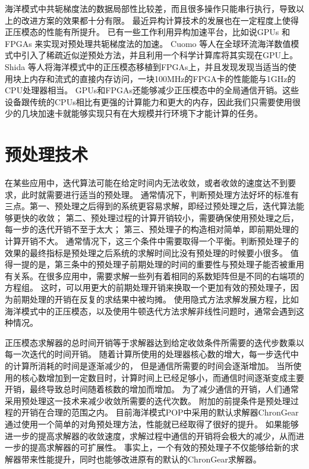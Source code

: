  

海洋模式中共轭梯度法的数据局部性比较差，而且很多操作只能串行执行，导致以上的改进方案的效果都十分有限。
最近异构计算技术的发展也在一定程度上使得正压模态的性能有所提升。 
已有一些工作利用异构加速平台，比如说GPUs \cite{cuomo2012pcg} 和FPGAs \cite{Shida2007}来实现对预处理共轭梯度法的加速。 
Cuomo 等人\cite{cuomo2012pcg}在全球环流海洋数值模式中引入了稀疏近似逆预处方法，并且利用一个科学计算库将其实现在GPU上。 
Shida 等人\cite{Shida2007}将海洋模式中的正压模态移植到FPGAs上，并且发现发现当适当的使用块上内存和流式的直接内存访问，一块100MHz的FPGA卡的性能能与1GHz的CPU处理器相当。 
GPUs和FPGAs还能够减少正压模态中的全局通信开销。这些设备跟传统的CPUs相比有更强的计算能力和更大的内存，因此我们只需要使用很少的几块加速卡就能够实现只有在大规模并行环境下才能计算的任务。 


\section{预处理技术}
\label{related:precond}
在某些应用中，迭代算法可能在给定时间内无法收敛，或者收敛的速度达不到要求，此时就需要进行适当的预处理。
通常情况下，判断预处理方法好坏的标准有三点。第一、预处理之后得到的系统更容易求解，即经过预处理之后，迭代算法能够更快的收敛； 第二、预处理过程的计算开销较小，需要确保使用预处理之后，每一步的迭代开销不至于太大； 第三、预处理子的构造相对简单，即前期处理的计算开销不大。 
通常情况下，这三个条件中需要取得一个平衡。判断预处理子的效果的最终指标是预处理之后系统的求解时间比没有预处理的时候要小很多。 
值得一提的是，第三条中的预处理子前期处理的时间的重要性与预处理子能否被重用有关系。在很多应用中，需要求解一些列有着相同的系数矩阵但是不同的右端项的方程组。
这时，可以用更大的前期处理开销来换取一个更加有效的预处理子，因为前期处理的开销在反复的求结果中被均摊。 
使用隐式方法求解发展方程，比如海洋模式中的正压模态，以及使用牛顿迭代方法求解非线性问题时，通常会遇到这种情况\cite{benzi2002preconditioning}。

正压模态求解器的总时间开销等于求解器达到给定收敛条件所需要的迭代步数乘以每一次迭代的时间开销。
随着计算所使用的处理器核心数的增大，每一步迭代中的计算所消耗的时间是逐渐减少的，
但是通信所需要的时间会逐渐增加。 
当所使用的核心数增加到一定数目时，计算时间上已经足够小，而通信时间逐渐变成主要开销，最终导致总时间随着核数的增加而增加。 
为了减少通信的开销，人们通常采用预处理这一技术来减少收敛所需要的迭代次数。
附加的前提条件是预处理过程的开销在合理的范围之内。 
目前海洋模式POP中采用的默认求解器ChronGear通过使用一个简单的对角预处理方法，性能就已经取得了很好的提升\cite{pini1990simple, reddy2013comparison}。 
如果能够进一步的提高求解器的收敛速度，求解过程中通信的开销将会极大的减少，从而进一步的提高求解器的可扩展性。
事实上，一个有效的预处理子不仅能够给新的求解器带来性能提升，同时也能够改进原有的默认的ChronGear求解器。


